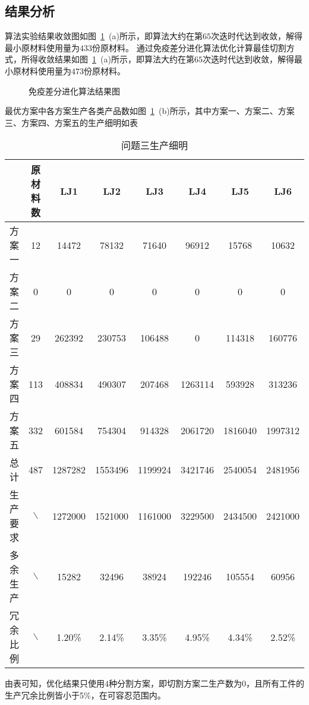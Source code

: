 \documentclass{whutmod}
\begin{document}
  	\subsection{结果分析}
  算法实验结果收敛图如图~\ref{asddadamd}~(a)所示，即算法大约在第$65$次迭时代达到收敛，解得最小原材料使用量为$433$份原材料。
  通过免疫差分进化算法优化计算最佳切割方式，所得收敛结果如图~\ref{asddadamd}~(a)所示，即算法大约在第$65$次迭时代达到收敛，解得最小原材料使用量为$473$份原材料。
 \begin{figure}[H]
 	\centering
 	\caption{免疫差分进化算法结果图}\label{asddadamd}
 \end{figure}
 最优方案中各方案生产各类产品数如图~\ref{asddadamd}~(b)所示，其中方案一、方案二、方案三、方案四、方案五的生产细明如表
 \begin{table}[H]
 	\setstretch{}  %
 	\centering		
 	\caption{问题三生产细明}\label{zhuanssssdasasgzai}
 	\begin{tabular}{cccccccc}
 		\toprule[2pt]
 		\multicolumn{1}{m{2cm}}{\centering }
 		& \multicolumn{1}{m{2cm}}{\centering 原材料数}
 		& \multicolumn{1}{m{1cm}}{\centering LJ1}
 		& \multicolumn{1}{m{1cm}}{\centering LJ2}
 		& \multicolumn{1}{m{1cm}}{\centering LJ3}
 		& \multicolumn{1}{m{1cm}}{\centering LJ4}
 		& \multicolumn{1}{m{1cm}}{\centering LJ5}
 		& \multicolumn{1}{m{1cm}}{\centering LJ6}
 		\\
 		\midrule[1pt]
 		方案一 & 12 &  14472     &  78132  &     71640   &    96912 &      15768    &   10632\\ 
 		方案二 & 0&  0   &  0 &      0 &     0 &     0    &       0\\ 
 		方案三 & 29& 262392   &   230753   &   106488    &       0   &   114318    &  160776\\ 
 		方案四&  113&   408834 &     490307 &     207468 &    1263114&      593928    &  313236\\ 
 		方案五 & 332 & 601584   &   754304  &    914328 &    2061720&     1816040 &    1997312\\ 
 		总计 &487 &  1287282  &   1553496  &   1199924   &  3421746   &  2540054   &  2481956\\ 
 		生产要求 &$\backslash$ & 1272000&1521000 &1161000 & 3229500&2434500 & 2421000\\ 
 		多余生产 &$\backslash$ &  15282    &   32496   &   38924     & 192246    &  105554    &   60956\\
 		冗余比例 &$\backslash$&  1.20\%   & 2.14\% &   3.35\%   & 4.95\% &  4.34\%   & 2.52\% \\ 
 		\bottomrule[2pt]	
 	\end{tabular}
 \end{table}
 由表可知，优化结果只使用$4$种分割方案，即切割方案二生产数为$0$，且所有工件的生产冗余比例皆小于5\%，在可容忍范围内。
  	
\end{document}
